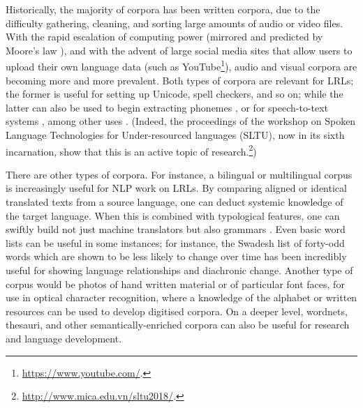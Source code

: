 Historically, the majority of corpora has been written corpora, due to the difficulty gathering, cleaning, and sorting large amounts of audio or video files. With the rapid escalation of computing power (mirrored and predicted by Moore's law \cite{schaller1997moore}), and with the advent of large social media sites that allow users to upload their own language data (such as YouTube\footnote{\href{https://www.youtube.com/}{https://www.youtube.com/}. }), audio and visual corpora are becoming more and more prevalent. Both types of corpora are relevant for LRLs; the former is useful for setting up Unicode, spell checkers, and so on; while the latter can also be used to begin extracting phonemes \citep{kempton2014discovering, muller2017improving}, or for speech-to-text systems \citep{fraga2015active, fraga2015improving}, among other uses \citep{adams2017automatic}. (Indeed, the proceedings of the workshop on Spoken Language Technologies for Under-resourced languages (SLTU), now in its sixth incarnation, show that this is an active topic of research.\footnote{\href{http://www.mica.edu.vn/sltu2018/}{http://www.mica.edu.vn/sltu2018/}. })

There are other types of corpora. For instance, a bilingual or multilingual corpus is increasingly useful for NLP work on LRLs. By comparing aligned or identical translated texts from a source language, one can deduct systemic knowledge of the target language. When this is combined with typological features, one can swiftly build not just machine translators \citep{lewis2010haitian} but also grammars \citep{bender2016linguistic}. Even basic word lists can be useful in some instances; for instance, the Swadesh list of forty-odd words which are shown to be less likely to change over time \citep{swadesh1955towards} has been incredibly useful for showing language relationships and diachronic change. Another type of corpus would be photos of hand written material or of particular font faces, for use in optical character recognition, where a knowledge of the alphabet or written resources can be used to develop digitised corpora. On a deeper level, wordnets, thesauri, and other semantically-enriched corpora can also be useful for research and language development.

